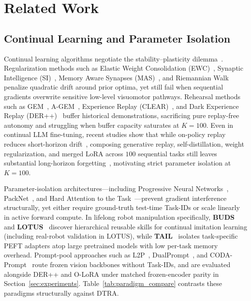 \documentclass[10pt]{article}
\begin{document}
\section{Related Work}
\label{sec:related}

\subsection{Continual Learning and Parameter Isolation}
Continual learning algorithms negotiate the stability--plasticity dilemma~\cite{mccloskey1989catastrophic,french1999catastrophic,parisi2019continual}. Regularization methods such as Elastic Weight Consolidation (EWC)~\cite{kirkpatrick2017ewc}, Synaptic Intelligence (SI)~\cite{zenke2017si}, Memory Aware Synapses (MAS)~\cite{aljundi2018mas}, and Riemannian Walk~\cite{chaudhry2018rwalk} penalize quadratic drift around prior optima, yet still fail when sequential gradients overwrite sensitive low-level visuomotor pathways. Rehearsal methods such as GEM~\cite{lopezpaz2017gem}, A-GEM~\cite{chaudhry2019agem}, Experience Replay (CLEAR)~\cite{rolnick2019clear}, and Dark Experience Replay (DER++)~\cite{buzzega2020der} buffer historical demonstrations, sacrificing pure replay-free autonomy and struggling when buffer capacity saturates at $K=100$. Even in continual LLM fine-tuning, recent studies show that while on-policy replay reduces short-horizon drift~\cite{chen2026opr}, composing generative replay, self-distillation, weight regularization, and merged LoRA across $100$ sequential tasks still leaves substantial long-horizon forgetting~\cite{zhang2026composecl}, motivating strict parameter isolation at $K=100$.

Parameter-isolation architectures---including Progressive Neural Networks~\cite{rusu2016pnn}, PackNet~\cite{mallya2018packnet}, and Hard Attention to the Task~\cite{serra2018hat}---prevent gradient interference structurally, yet either require ground-truth test-time Task-IDs or scale linearly in active forward compute. In lifelong robot manipulation specifically, \textbf{BUDS}~\cite{zhu2022buds} and \textbf{LOTUS}~\cite{wan2024lotus} discover hierarchical reusable skills for continual imitation learning (including real-robot validation in LOTUS), while \textbf{TAIL}~\cite{liu2024tail} isolates task-specific PEFT adapters atop large pretrained models with low per-task memory overhead. Prompt-pool approaches such as L2P~\cite{wang2022l2p}, DualPrompt~\cite{wang2022dualprompt}, and CODA-Prompt~\cite{smith2023coda} route frozen vision backbones without Task-IDs, and are evaluated alongside DER++ and O-LoRA under matched frozen-encoder parity in Section~\ref{sec:experiments}. Table~\ref{tab:paradigm_compare} contrasts these paradigms structurally against DTRA.
\end{document}
